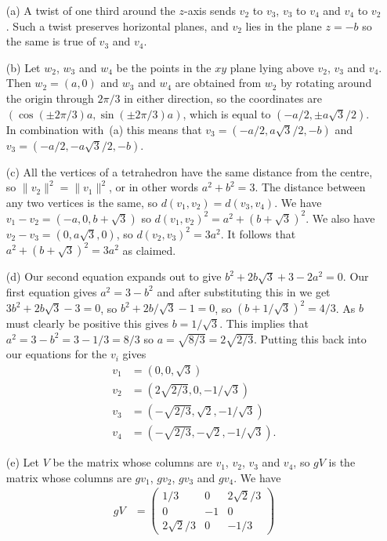 \documentclass{amsart}
\renewcommand{\:}{\colon}
\newcommand{\bsm}       {\left(\begin{smallmatrix}}
\newcommand{\esm}       {\end{smallmatrix}\right)}
\theoremstyle{definition}
\newenvironment{solution}{{\noindent\bf Solution:}}{}
\begin{document}
\begin{solution}
 \begin{itemize}
 \item[(a)] A twist of one third around the $z$-axis sends $v_2$ to
  $v_3$, $v_3$ to $v_4$ and $v_4$ to $v_2$.  Such a twist preserves
  horizontal planes, and $v_2$ lies in the plane $z=-b$ so the same is
  true of $v_3$ and $v_4$.
 \item[(b)] Let $w_2$, $w_3$ and $w_4$ be the points in the $xy$ plane
  lying above $v_2$, $v_3$ and $v_4$.  Then $w_2=(a,0)$ and $w_3$ and
  $w_4$ are obtained from $w_2$ by rotating around the origin through
  $2\pi/3$ in either direction, so the coordinates are
  $(\cos(\pm 2\pi/3)a,\sin(\pm 2\pi/3)a)$, which is equal to
  $(-a/2,\pm a\sqrt{3}/2)$.  In combination with~(a) this means that
  $v_3=(-a/2,a\sqrt{3}/2,-b)$ and $v_3=(-a/2,-a\sqrt{3}/2,-b)$.
 \item[(c)] All the vertices of a tetrahedron have the same distance
  from the centre, so $\|v_2\|^2=\|v_1\|^2$, or in other words
  $a^2+b^2=3$.  The distance between any two vertices is the same, so
  $d(v_1,v_2)=d(v_3,v_4)$.  We have $v_1-v_2=(-a,0,b+\sqrt{3})$ so
  $d(v_1,v_2)^2=a^2+(b+\sqrt{3})^2$.  We also have
  $v_2-v_3=(0,a\sqrt{3},0)$, so $d(v_2,v_3)^2=3a^2$.  It follows that
  $a^2+(b+\sqrt{3})^2=3a^2$ as claimed.
 \item[(d)] Our second equation expands out to give
  $b^2+2b\sqrt{3}+3-2a^2=0$.  Our first equation gives $a^2=3-b^2$ and
  after substituting this in we get $3b^2+2b\sqrt{3}-3=0$, so
  $b^2+2b/\sqrt{3}-1=0$, so $(b+1/\sqrt{3})^2=4/3$.  As $b$ must
  clearly be positive this gives $b=1/\sqrt{3}$.  This implies that
  $a^2=3-b^2=3-1/3=8/3$ so $a=\sqrt{8/3}=2\sqrt{2/3}$.  Putting this
  back into our equations for the $v_i$ gives
  \begin{align*}
   v_1 &= (0,0,\sqrt{3}) \\
   v_2 &= (2\sqrt{2/3},0,-1/\sqrt{3}) \\
   v_3 &= (-\sqrt{2/3},\sqrt{2},-1/\sqrt{3}) \\
   v_4 &= (-\sqrt{2/3},-\sqrt{2},-1/\sqrt{3}).
  \end{align*}
 \item[(e)] Let $V$ be the matrix whose columns are $v_1$, $v_2$,
  $v_3$ and $v_4$, so $gV$ is the matrix whose columns are $gv_1$,
  $gv_2$, $gv_3$ and $gv_4$.  We have
  \begin{align*}
   gV &= \bsm 1/3&0&2\sqrt{2}/3\\0&-1&0\\2\sqrt{2}/3&0&-1/3 \esm 

\end{align*}
\end{itemize}
\end{solution}
\end{document}
